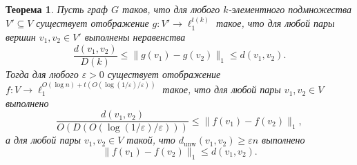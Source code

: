 \documentclass[12pt]{article}
\newcommand{\eps}{\varepsilon}
\newcommand{\dunw}{d_{\mathrm{unw}}}
\newtheorem{theorem}{Теорема}
\begin{document}
    \begin{theorem}
        \label{subsampling}
        Пусть граф $G$ таков, что для любого $k$-элементного подмножества $V' \subseteq V$
        существует отображение $g \colon V' \to \ell_1^{t(k)}$ такое, что для любой пары вершин $v_1, v_2 \in V'$
        выполнены неравенства
        $$
            \frac{d(v_1, v_2)}{D(k)} \leq \|g(v_1) - g(v_2)\|_1 \leq d(v_1, v_2).
        $$
        Тогда для любого $\eps > 0$ существует отображение $f \colon V \to \ell_1^{O(\log n) + t(O(\log(1 / \eps) / \eps))}$
        такое, что для любой пары $v_1, v_2 \in V$ выполнено
        $$
            \frac{d(v_1, v_2)}{O(D(O(\log(1 / \eps) / \eps)))} \leq \|f(v_1) - f(v_2)\|_1,
        $$
        а для любой пары $v_1, v_2 \in V$ такой, что $\dunw(v_1, v_2) \geq \eps n$ выполнено
        $$
            \|f(v_1) - f(v_2)\|_1 \leq d(v_1, v_2).
        $$
    \end{theorem}
\end{document}
